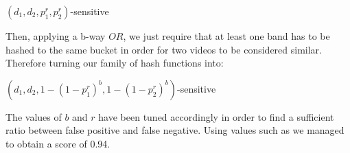 \documentclass[a4paper, 11pt]{article}
\begin{document}
\vspace{8pt}
\begin{center}
	$(d_{1},d_{2},p_{1}^r,p_{2}^r)$-sensitive
\end{center}
\vspace{8pt}
Then, applying a b-way $OR$, we just require that at least one band has to be hashed to the same bucket in order for two videos to be considered similar. Therefore turning our family of hash functions into:
\vspace{8pt}
\begin{center}
	$(d_{1},d_{2},1-(1-p_{1}^r)^b,1-(1-p_{2}^r)^b)$-sensitive
\end{center}
\vspace{8pt}
The values of $b$ and $r$ have been tuned accordingly in order to find a sufficient ratio between false positive and false negative. Using values such as %
we managed to obtain a score of 0.94.
\end{document}
